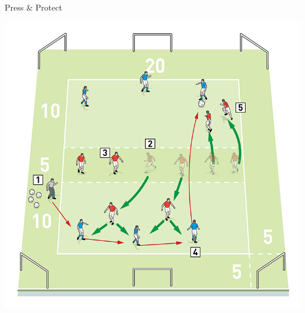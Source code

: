 \begin{evenBlock}{Press \& Protect}

\begin{minipage}[t]{\linewidth}
    \centering
    
    \begin{minipage}{.4\linewidth} %
        \centering
        \includegraphics[width=\textwidth]{../img/Trimmed/Press_Protect}

        \vspace{6pt}
        

\end{minipage}
\end{minipage}
\end{evenBlock}

